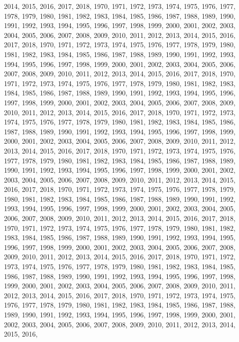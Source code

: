 \documentclass[
]{article}
\begin{document}
2014, 2015, 2016, 2017, 2018, 1970, 1971, 1972, 1973, 1974, 1975, 1976,
1977, 1978, 1979, 1980, 1981, 1982, 1983, 1984, 1985, 1986, 1987, 1988,
1989, 1990, 1991, 1992, 1993, 1994, 1995, 1996, 1997, 1998, 1999, 2000,
2001, 2002, 2003, 2004, 2005, 2006, 2007, 2008, 2009, 2010, 2011, 2012,
2013, 2014, 2015, 2016, 2017, 2018, 1970, 1971, 1972, 1973, 1974, 1975,
1976, 1977, 1978, 1979, 1980, 1981, 1982, 1983, 1984, 1985, 1986, 1987,
1988, 1989, 1990, 1991, 1992, 1993, 1994, 1995, 1996, 1997, 1998, 1999,
2000, 2001, 2002, 2003, 2004, 2005, 2006, 2007, 2008, 2009, 2010, 2011,
2012, 2013, 2014, 2015, 2016, 2017, 2018, 1970, 1971, 1972, 1973, 1974,
1975, 1976, 1977, 1978, 1979, 1980, 1981, 1982, 1983, 1984, 1985, 1986,
1987, 1988, 1989, 1990, 1991, 1992, 1993, 1994, 1995, 1996, 1997, 1998,
1999, 2000, 2001, 2002, 2003, 2004, 2005, 2006, 2007, 2008, 2009, 2010,
2011, 2012, 2013, 2014, 2015, 2016, 2017, 2018, 1970, 1971, 1972, 1973,
1974, 1975, 1976, 1977, 1978, 1979, 1980, 1981, 1982, 1983, 1984, 1985,
1986, 1987, 1988, 1989, 1990, 1991, 1992, 1993, 1994, 1995, 1996, 1997,
1998, 1999, 2000, 2001, 2002, 2003, 2004, 2005, 2006, 2007, 2008, 2009,
2010, 2011, 2012, 2013, 2014, 2015, 2016, 2017, 2018, 1970, 1971, 1972,
1973, 1974, 1975, 1976, 1977, 1978, 1979, 1980, 1981, 1982, 1983, 1984,
1985, 1986, 1987, 1988, 1989, 1990, 1991, 1992, 1993, 1994, 1995, 1996,
1997, 1998, 1999, 2000, 2001, 2002, 2003, 2004, 2005, 2006, 2007, 2008,
2009, 2010, 2011, 2012, 2013, 2014, 2015, 2016, 2017, 2018, 1970, 1971,
1972, 1973, 1974, 1975, 1976, 1977, 1978, 1979, 1980, 1981, 1982, 1983,
1984, 1985, 1986, 1987, 1988, 1989, 1990, 1991, 1992, 1993, 1994, 1995,
1996, 1997, 1998, 1999, 2000, 2001, 2002, 2003, 2004, 2005, 2006, 2007,
2008, 2009, 2010, 2011, 2012, 2013, 2014, 2015, 2016, 2017, 2018, 1970,
1971, 1972, 1973, 1974, 1975, 1976, 1977, 1978, 1979, 1980, 1981, 1982,
1983, 1984, 1985, 1986, 1987, 1988, 1989, 1990, 1991, 1992, 1993, 1994,
1995, 1996, 1997, 1998, 1999, 2000, 2001, 2002, 2003, 2004, 2005, 2006,
2007, 2008, 2009, 2010, 2011, 2012, 2013, 2014, 2015, 2016, 2017, 2018,
1970, 1971, 1972, 1973, 1974, 1975, 1976, 1977, 1978, 1979, 1980, 1981,
1982, 1983, 1984, 1985, 1986, 1987, 1988, 1989, 1990, 1991, 1992, 1993,
1994, 1995, 1996, 1997, 1998, 1999, 2000, 2001, 2002, 2003, 2004, 2005,
2006, 2007, 2008, 2009, 2010, 2011, 2012, 2013, 2014, 2015, 2016, 2017,
2018, 1970, 1971, 1972, 1973, 1974, 1975, 1976, 1977, 1978, 1979, 1980,
1981, 1982, 1983, 1984, 1985, 1986, 1987, 1988, 1989, 1990, 1991, 1992,
1993, 1994, 1995, 1996, 1997, 1998, 1999, 2000, 2001, 2002, 2003, 2004,
2005, 2006, 2007, 2008, 2009, 2010, 2011, 2012, 2013, 2014, 2015, 2016,
\end{document}
